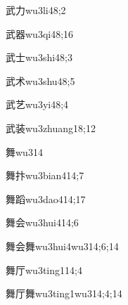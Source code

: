\begin{verbete}{武力}{wu3li4}{8;2}
\end{verbete}

\begin{verbete}{武器}{wu3qi4}{8;16}
\end{verbete}

\begin{verbete}{武士}{wu3shi4}{8;3}
\end{verbete}

\begin{verbete}{武术}{wu3shu4}{8;5}
\end{verbete}

\begin{verbete}{武艺}{wu3yi4}{8;4}
\end{verbete}

\begin{verbete}{武装}{wu3zhuang1}{8;12}
\end{verbete}

\begin{verbete}{舞}{wu3}{14}
\end{verbete}

\begin{verbete}{舞抃}{wu3bian4}{14;7}
\end{verbete}

\begin{verbete}{舞蹈}{wu3dao4}{14;17}
\end{verbete}

\begin{verbete}{舞会}{wu3hui4}{14;6}
\end{verbete}

\begin{verbete}{舞会舞}{wu3hui4wu3}{14;6;14}
\end{verbete}

\begin{verbete}{舞厅}{wu3ting1}{14;4}
\end{verbete}

\begin{verbete}{舞厅舞}{wu3ting1wu3}{14;4;14}
\end{verbete}

